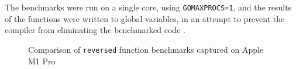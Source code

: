 The benchmarks were run on a single core, using \texttt{GOMAXPROCS=1}, and the
results of the functions were written to global variables, in an attempt to
prevent the compiler from eliminating the benchmarked code \autocite{benchPits}.

\begin{figure}
    
    \caption{Comparison of \texttt{reversed} function benchmarks captured on
        Apple M1 Pro}
\end{figure}




















